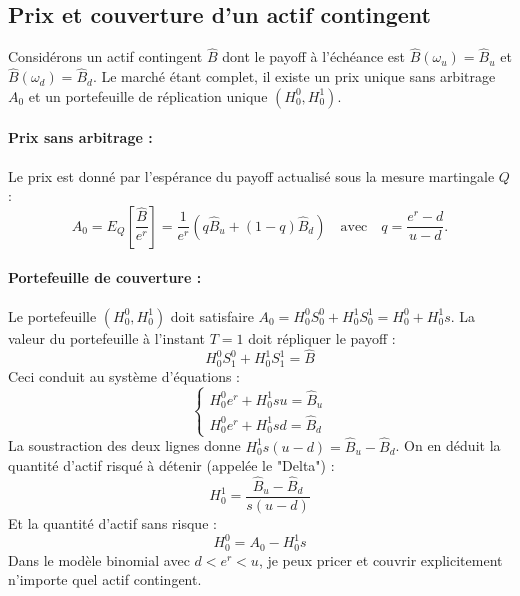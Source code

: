 \subsection{Prix et couverture d'un actif contingent}
Considérons un actif contingent $\hat{B}$ dont le payoff à l'échéance est $\hat{B}(\omega_u) = \hat{B}_u$ et $\hat{B}(\omega_d) = \hat{B}_d$.
Le marché étant complet, il existe un prix unique sans arbitrage $A_0$ et un portefeuille de réplication unique $(H_0^0, H_0^1)$.

\paragraph{Prix sans arbitrage :}
Le prix est donné par l'espérance du payoff actualisé sous la mesure martingale $Q$ :
\begin{equation}
A_0 = E_Q\left[\frac{\hat{B}}{e^r}\right] = \frac{1}{e^r} \left( q \hat{B}_u + (1-q) \hat{B}_d \right) \quad \text{avec} \quad q = \frac{e^r - d}{u - d}.
\end{equation}

\paragraph{Portefeuille de couverture :}
Le portefeuille $(H_0^0, H_0^1)$ doit satisfaire $A_0 = H_0^0 S_0^0 + H_0^1 S_0^1 = H_0^0 + H_0^1 s$.
La valeur du portefeuille à l'instant $T=1$ doit répliquer le payoff :
\begin{equation}
H_0^0 S_1^0 + H_0^1 S_1^1 = \hat{B}
\end{equation}
Ceci conduit au système d'équations :
\begin{equation}
\begin{cases}
    H_0^0 e^r + H_0^1 su = \hat{B}_u \\
    H_0^0 e^r + H_0^1 sd = \hat{B}_d
\end{cases}
\end{equation}
La soustraction des deux lignes donne $H_0^1 s(u-d) = \hat{B}_u - \hat{B}_d$. On en déduit la quantité d'actif risqué à détenir (appelée le "Delta") :
\begin{equation}
H_0^1 = \frac{\hat{B}_u - \hat{B}_d}{s(u-d)}
\end{equation}
Et la quantité d'actif sans risque :
\begin{equation}
H_0^0 = A_0 - H_0^1 s
\end{equation}
Dans le modèle binomial avec $d < e^r < u$, je peux pricer et couvrir explicitement n'importe quel actif contingent.

